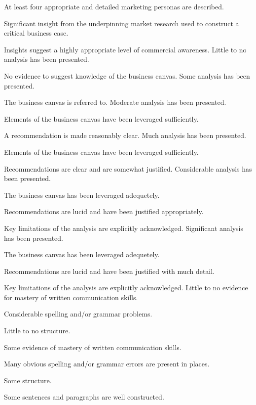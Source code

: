 \documentclass{../../fal_assignment}
\begin{document}
\begin{markingrubric}
        \par 		At least four appropriate and detailed marketing personas are described.
        \par 		Significant insight from the underpinning market research used to construct a critical business case.
    	\par 		Insights suggest a highly appropriate level of commercial awareness.
%
%
        \grade  \fail	Little to no analysis has been presented.
         \par		No evidence to suggest knowledge of the business canvas.
        \grade 		Some analysis has been presented. 
         \par		The business canvas is referred to.
        \grade 		Moderate analysis has been presented.
         \par		Elements of the business canvas have been leveraged sufficiently.
         \par		A recommendation is made reasonably clear.
        \grade 		Much analysis has been presented.
         \par		Elements of the business canvas have been leveraged sufficiently.
         \par		Recommendations are clear and are somewhat justified.
        \grade 		Considerable analysis has been presented.
         \par		The business canvas has been leveraged adequetely.
         \par		Recommendations are lucid and have been justified appropriately.
         \par		Key limitations of the analysis are explicitly acknowledged.
         \grade 		Significant analysis has been presented.
         \par		The business canvas has been leveraged adequetely.
         \par		Recommendations are lucid and have been justified with much detail.
	\par		Key limitations of the analysis are explicitly acknowledged.
%
        \grade  \fail	Little to no evidence for mastery of written communication skills.
        \par 		Considerable spelling and/or grammar problems.
        \par 		Little to no structure.
     
        \grade 		Some evidence of mastery of written communication skills.
        \par 		Many obvious spelling and/or grammar errors are present in places.
        \par 		Some structure.   
        \par 		Some sentences and paragraphs are well constructed.
        

\end{markingrubric}
\end{document}
